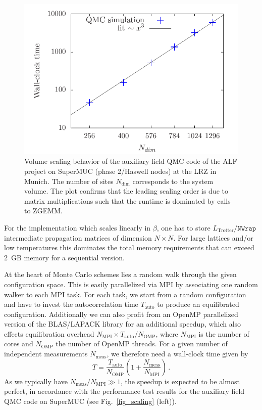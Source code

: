 \begin{figure}[h]
	\begin{center}
		\includegraphics[scale=.8]{Figures/Size_scaling_ALF_2.pdf}
	\end{center}
	\caption{\label{fig_scaling_size}Volume scaling behavior of the auxiliary field QMC code of the ALF project on SuperMUC (phase 2/Haswell nodes) at the LRZ in Munich. The number of sites $N_{\text{dim}}$ corresponds to the system volume.
	The plot confirms that the leading scaling order is due to matrix multiplications such that the runtime is dominated by calls to ZGEMM. }
\end{figure}

For the implementation which scales linearly in $\beta$, one has to store $L_{\text{Trotter}}/\texttt{NWrap}$ intermediate propagation matrices of dimension $N\times N$. For large lattices and/or low temperatures this dominates the total memory requirements that can exceed 2~GB memory for a sequential version.

At the heart of Monte Carlo schemes lies a random walk through the given configuration space. This is easily parallelized via MPI by associating one random walker to each MPI task. For each task, we start from a random configuration and have to invest the autocorrelation time $T_\mathrm{auto}$ to produce an equilibrated configuration.
Additionally we can also profit from an OpenMP parallelized version of the BLAS/LAPACK library for an additional speedup, which also effects equilibration overhead $N_\text{MPI}\times T_\text{auto} / N_\text{OMP}$, where $N_{\text{MPI}}$ is the number of cores and $N_{\text{OMP}}$ the number of OpenMP threads.
For a given number of independent measurements  $N_\text{meas}$, we  therefore need a wall-clock time given by
\begin{equation}\label{eqn:scaling}
T  =  \frac{T_\text{auto}}{N_\text{OMP}} \left( 1   +    \frac{N_\text{meas}}{N_\text{MPI}}  \right) \,.
\end{equation}
As we typically have $ N_\text{meas}/N_\text{MPI} \gg 1 $, 
the speedup is expected to be almost perfect, in accordance with
the performance test results for the auxiliary field
QMC code  on SuperMUC (see Fig.~\ref{fig_scaling} (left)).


